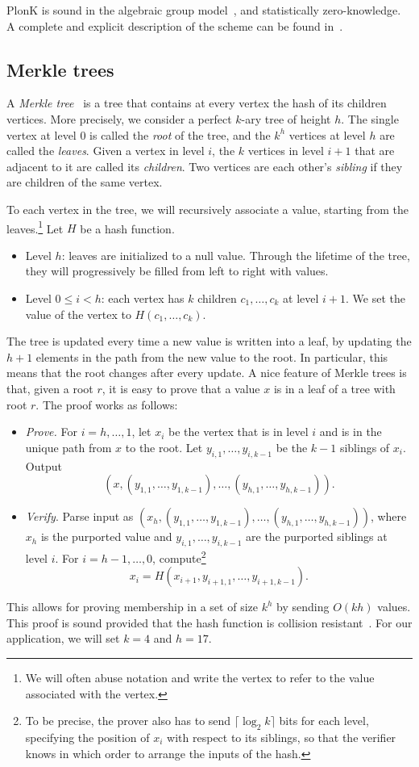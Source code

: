 PlonK is sound in the algebraic group model~\cite{fuchsbauer2018algebraic}, and statistically zero-knowledge. A complete and explicit description of the scheme can be found in~\cite[Section~8]{gabizon2019plonk}.

\subsection{Merkle trees}\label{sec:merkle_trees}

A \emph{Merkle tree}~\cite{merkle1987digital} is a tree that contains at every vertex the hash of its children vertices. More precisely, we consider a perfect $k$-ary tree of height $h$. The single vertex at level $0$ is called the \emph{root} of the tree, and the $k^{h}$ vertices at level $h$ are called the \emph{leaves}. Given a vertex in level $i$, the $k$ vertices in level $i+1$ that are adjacent to it are called its \emph{children}. Two vertices are each other's \emph{sibling} if they are children of the same vertex.

To each vertex in the tree, we will recursively associate a value, starting from the leaves.\footnote{We will often abuse notation and write the vertex to refer to the value associated with the vertex.} Let $H$ be a hash function. 
\begin{itemize}
	\item Level $h$: leaves are initialized to a null value. Through the lifetime of the tree, they will progressively be filled from left to right with values.
	\item Level $0\leq i <h$: each vertex has $k$ children $c_1,\dots, c_k$ at level $i+1$. We set the value of the vertex to $H({c_1}, \dots, {c_k})$. 
\end{itemize}

The tree is updated every time a new value is written into a leaf, by updating the $h+1$ elements in the path from the new value to the root. In particular, this means that the root changes after every update. A nice feature of Merkle trees is that, given a root $r$, it is easy to prove that a value $x$ is in a leaf of a tree with root $r$. The proof works as follows: 
\begin{itemize}
	\item \emph{Prove.} For $i=h,\dots,1$, let $x_i$ be the vertex that is in level $i$ and is in the unique path from $x$ to the root. Let $y_{i, 1},\dots, y_{i, k-1}$ be the $k-1$ siblings of $x_i$. Output
	\[(x, (y_{1,1}, \dots, y_{1,k-1}), \dots, (y_{h,1},\dots,y_{h,k-1})).\]
	\item \emph{Verify}. Parse input as $(x_h, (y_{1,1}, \dots, y_{1,k-1}), \dots, (y_{h,1},\dots,y_{h,k-1}))$, where $x_h$ is the purported value and $y_{i,1},\dots,y_{i,k-1}$ are the purported siblings at level $i$. For $i=h-1,\dots, 0$, compute\footnote{To be precise, the prover also has to send $\lceil\log_2k\rceil$ bits for each level, specifying the position of $x_i$ with respect to its siblings, so that the verifier knows in which order to arrange the inputs of the hash.}
	\[x_i = H\left( x_{i+1}, y_{i+1,1},\dots,y_{i+1,k-1} \right).\] 
\end{itemize}

This allows for proving membership in a set of size $k^h$ by sending $O(kh)$ values. This proof is sound provided that the hash function is collision resistant~\cite[Section 5.6.2]{katz2020introduction}. For our application, we will set $k=4$ and $h=17$.